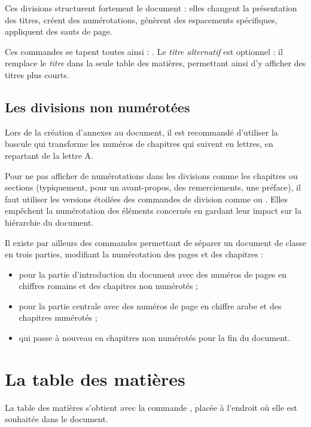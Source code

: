 Ces divisions structurent fortement le document : elles changent la présentation des titres, créent des numérotations, génèrent des espacements spécifiques, appliquent des sauts de page. 

Ces commandes se tapent toutes ainsi : . Le \emph{titre alternatif} est optionnel : il remplace le \emph{titre} dans la seule table des matières, permettant ainsi d'y afficher des titres plus courts. 

\subsection{Les divisions non numérotées}

Lors de la création d'annexes au document, il est recommandé d'utiliser la bascule  qui transforme les numéros de chapitres qui suivent en lettres, en repartant de la lettre A. 

Pour ne pas afficher de numérotations dans les divisions comme les chapitres ou sections (typiquement, pour un avant-propos, des remerciements, une préface), il faut utiliser les versions \og étoilées \fg des commandes de division comme  ou . Elles empêchent la numérotation des éléments concernés en gardant leur impact sur la hiérarchie du document.

Il existe par ailleurs des commandes permettant de séparer un document de classe  en trois parties, modifiant la numérotation des pages et des chapitres : 
\begin{itemize} 
\item {} pour la partie d'introduction du document avec des numéros de pages en chiffres romains et des chapitres non numérotés ;
\item {} pour la partie centrale avec des numéros de page en chiffre arabe et des chapitres numérotés ;
\item {} qui passe à nouveau en chapitres non numérotés pour la fin du document.
\end{itemize}

\section{La table des matières}  

La table des matières s'obtient avec la commande , placée à l'endroit où elle est souhaitée dans le document.

